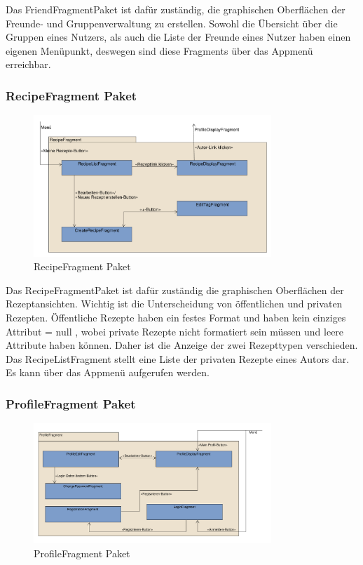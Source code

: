 Das FriendFragmentPaket ist dafür zuständig, die graphischen Oberflächen der Freunde- und Gruppenverwaltung zu erstellen. 
Sowohl die Übersicht über die Gruppen eines Nutzers, als auch die Liste der Freunde eines Nutzer haben einen eigenen Menüpunkt, deswegen sind diese Fragments über das Appmenü erreichbar.


\subsubsection{RecipeFragment Paket}
\begin{figure}[H]
	\centering
	\includegraphics[width=0.8\textwidth]{pics/viewPackages/RecipeFragmentPaket.pdf}%
	\caption{RecipeFragment Paket}%
	\label{view}%
\end{figure}

Das RecipeFragmentPaket ist dafür zuständig die graphischen Oberflächen der Rezeptansichten. 
Wichtig ist die Unterscheidung von öffentlichen und privaten Rezepten. Öffentliche Rezepte haben ein festes Format und haben kein einziges Attribut = null , wobei private Rezepte nicht formatiert sein müssen und leere Attribute haben können. Daher ist die Anzeige der zwei Rezepttypen verschieden. 
Das RecipeListFragment stellt eine Liste der privaten Rezepte eines Autors dar. Es kann über das Appmenü aufgerufen werden.

\subsubsection{ProfileFragment Paket}
\begin{figure}[H]
	\centering
	\includegraphics[width=0.8\textwidth]{pics/viewPackages/ProfileFragmentPaket.pdf}%
	\caption{ProfileFragment Paket}%
	\label{view}%
\end{figure}

